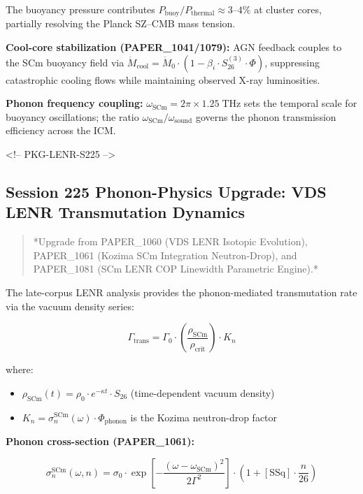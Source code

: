 \documentclass[12pt,a4paper]{article}
\begin{document}
The buoyancy pressure contributes $P_{\text{buoy}}/P_{\text{thermal}} \approx 3\text{--}4\%$ at cluster cores, partially resolving the Planck SZ--CMB mass tension.

\textbf{Cool-core stabilization (PAPER\_1041/1079):} AGN feedback couples to the SCm buoyancy field via $\dot{M}_{\text{cool}} = \dot{M}_0 \cdot (1 - \beta_i \cdot S_{26}^{(3)} \cdot \Phi)$, suppressing catastrophic cooling flows while maintaining observed X-ray luminosities.

\textbf{Phonon frequency coupling:} $\omega_{\text{SCm}} = 2\pi \times 1.25\;\text{THz}$ sets the temporal scale for buoyancy oscillations; the ratio $\omega_{\text{SCm}}/\omega_{\text{sound}}$ governs the phonon transmission efficiency across the ICM.

<!-- PKG-LENR-S225 -->

\subsection{Session 225 Phonon-Physics Upgrade: VDS LENR Transmutation Dynamics}

\begin{quote}
*Upgrade from PAPER\_1060 (VDS LENR Isotopic Evolution), PAPER\_1061
(Kozima SCm Integration Neutron-Drop), and PAPER\_1081 (SCm LENR COP
Linewidth Parametric Engine).*
\end{quote}

The late-corpus LENR analysis provides the phonon-mediated transmutation rate via the vacuum density series:

\begin{equation}
\Gamma_{\text{trans}} = \Gamma_0 \cdot \left(\frac{\rho_{\text{SCm}}}{\rho_{\text{crit}}}\right) \cdot K_n
\end{equation}

where:

\begin{itemize}
  \item $\rho_{\text{SCm}}(t) = \rho_0 \cdot e^{-\kappa t} \cdot S_{26}$ (time-dependent vacuum density)
  \item $K_n = \sigma_n^{\text{SCm}}(\omega) \cdot \Phi_{\text{phonon}}$ is the Kozima neutron-drop factor
\end{itemize}

\textbf{Phonon cross-section (PAPER\_1061):}

\begin{equation}
\sigma_n^{\text{SCm}}(\omega, n) = \sigma_0 \cdot \exp\!\left[-\frac{(\omega - \omega_{\text{SCm}})^2}{2\Gamma^2}\right] \cdot \left(1 + [\text{SSq}] \cdot \frac{n}{26}\right)
\end{equation}
\end{document}
